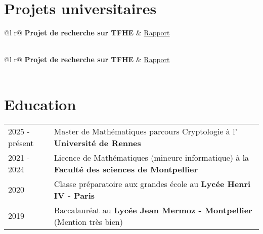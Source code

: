 \documentclass[a4paper,12pt]{article}
\makeatletter
\newenvironment{joblong}[2]
    {
    \begin{tabularx}{\linewidth}{@{}l X r@{}}
    \textbf{#1} & \hfill &  #2 \\[3.75pt]
    \end{tabularx}
    \begin{minipage}[t]{\linewidth}
    \begin{itemize}[nosep,after=\strut, leftmargin=1em, itemsep=3pt,label=--]
    }
    {
    \end{itemize}
    \end{minipage}    
    }
\makeatother
\begin{document}


\section{Projets universitaires}

\begin{tabularx}{\linewidth}{ @{}l r@{} }
\textbf{Projet de recherche sur TFHE} & \hfill \href{https://some-link.com}{Rapport} \\[3.75pt]
  \\
\end{tabularx}

\begin{tabularx}{\linewidth}{ @{}l r@{} }
\textbf{Projet de recherche sur TFHE} & \hfill \href{https://some-link.com}{Rapport} \\[3.75pt]
  \\
\end{tabularx}

\section{Education}
\begin{tabularx}{\linewidth}{@{}l X@{}}	


2025 - présent & Master de Mathématiques parcours Cryptologie à l' \textbf{Université de Rennes} \hfill  \\ 

2021 - 2024 & Licence de Mathématiques (mineure informatique) à la \textbf{Faculté des sciences de Montpellier} \hfill   \\

2020 & Classe préparatoire aux grandes école au \textbf{Lycée Henri IV - Paris} \hfill   \\

2019 & Baccalauréat au \textbf{Lycée Jean Mermoz - Montpellier} \hfill (Mention très bien)
\end{tabularx}
\end{document}
